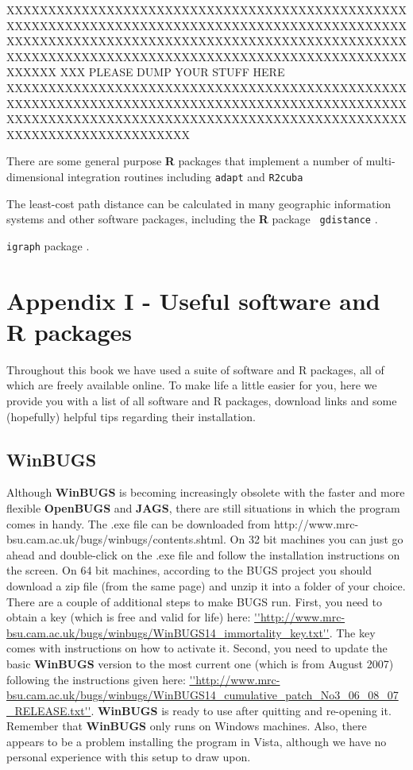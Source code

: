 XXXXXXXXXXXXXXXXXXXXXXXXXXXXXXXXXXXXXXXXXXXXXXXXXXXXXXXXXXXXXXXXXXXXXXXXXXXXXXXXXXXXXXXXXXXXXXXXXXXXXXXXXXXXXXXXXXXXXXXXXXXXXXXXXXXXXXXXXXXXXXXXXXXXXXXXXXXXXXXXXXXXXXXXXXXXXXXXXXXXXXXXXXXXXXXXXXXXXX
XXX PLEASE DUMP YOUR STUFF HERE XXXXXXXXXXXXXXXXXXXXXXXXXXXXXXXXXXXXXXXXXXXXXXXXXXXXXXXXXXXXXXXXXXXXXXXXXXXXXXXXXXXXXXXXXXXXXXXXXXXXXXXXXXXXXXXXXXXXXXXXXXXXXXXXXXXXXXXXXXXXXXXXXXXXXXXXXXXXXXXXXXXXXX

There are some general purpose {\bf
  R} packages that implement a number of 
 multi-dimensional integration routines
including \mbox{\tt adapt} \citep{genz_etal:2007} and \mbox{\tt R2cuba}
\citep{hahn_etal:2011}

The least-cost path distance can be calculated in
 many geographic information systems and other software packages,
including the {\bf R} package \mbox{\tt
  gdistance} \citep{vanetten:2011}.
  
  \mbox{\tt igraph} package
\citep{csardi:2010}. 


\chapter{Appendix I - Useful software and R packages}
\label{chapt.app1}

\vspace{.3in}

Throughout this book we have used a suite of software and R packages, all of which are freely available online. To make life a little easier for you, here we provide you with a list of all software and R packages, download links and some (hopefully) helpful tips regarding their installation.  


\section{WinBUGS}
Although {\bf WinBUGS} \citep{gilks_etal:1994} is becoming increasingly obsolete with the faster and more flexible {\bf OpenBUGS} and {\bf JAGS}, there are still situations in which the program comes in handy.  
The .exe file can be downloaded from http://www.mrc-bsu.cam.ac.uk/bugs/winbugs/contents.shtml. On 32 bit machines you can just go ahead and double-click on the .exe file and follow the installation instructions on the screen.
On 64 bit machines, according to the BUGS project you should download a zip file (from the same page) and unzip it into a folder of your choice.
There are a couple of additional steps to make BUGS run. 
First, you need to obtain a key (which is free and valid for life) here: \url{''http://www.mrc-bsu.cam.ac.uk/bugs/winbugs/WinBUGS14_immortality_key.txt''}. The key comes with instructions on how to activate it.
Second, you need to update the basic {\bf WinBUGS} version to the most current one (which is from August 2007) following the instructions given here: \url{''http://www.mrc-bsu.cam.ac.uk/bugs/winbugs/WinBUGS14_cumulative_patch_No3_06_08_07_RELEASE.txt''}.
{\bf WinBUGS} is ready to use after quitting and re-opening it.
Remember that {\bf WinBUGS} only runs on Windows machines. Also, there appears to be a problem installing the program in Vista, although we have no personal experience with this setup to draw upon.

